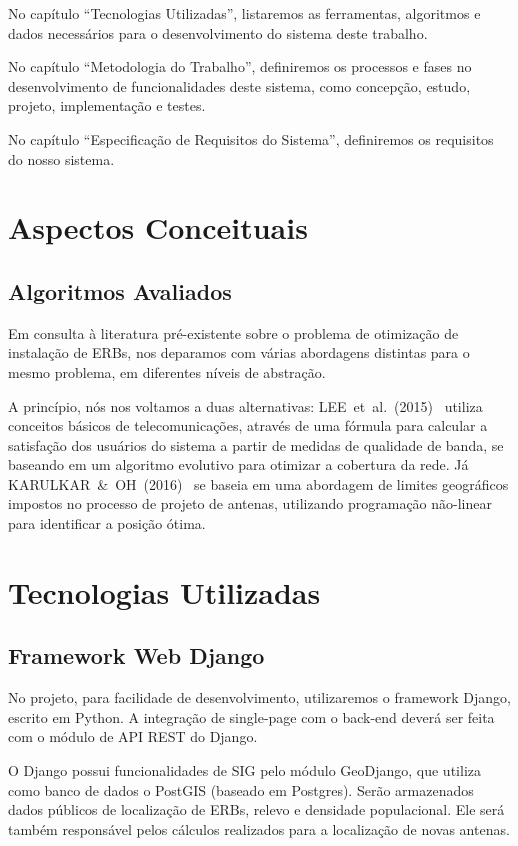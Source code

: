 \documentclass[]{politex}
\begin{document}
No capítulo ``Tecnologias Utilizadas'', listaremos as ferramentas, algoritmos
e dados necessários para o desenvolvimento do sistema deste trabalho.

No capítulo ``Metodologia do Trabalho'', definiremos os processos e fases
no desenvolvimento de funcionalidades deste sistema, como concepção, estudo,
projeto, implementação e testes.

No capítulo ``Especificação de Requisitos do Sistema'', definiremos os
requisitos do nosso sistema.

\chapter{Aspectos Conceituais}

\section{Algoritmos Avaliados}
Em consulta à literatura pré-existente sobre o problema de otimização de
instalação de ERBs, nos deparamos com várias abordagens distintas para o mesmo
problema, em diferentes níveis de abstração.

A princípio, nós nos voltamos a duas alternativas: LEE~et~al.~(2015)~
\cite{evolutivo} utiliza conceitos básicos de telecomunicações, através de uma
fórmula para calcular a satisfação dos usuários do sistema a partir de medidas
de qualidade de banda, se baseando em um algoritmo evolutivo para otimizar
a cobertura da rede. Já KARULKAR~\&~OH~(2016)~\cite{nao-linear} se baseia em
uma abordagem de limites geográficos impostos no processo de projeto de antenas,
utilizando programação não-linear para identificar a posição ótima.

\chapter{Tecnologias Utilizadas}

\section{Framework Web Django}
No projeto, para facilidade de desenvolvimento, utilizaremos o framework Django,
escrito em Python. A integração de single-page com o back-end deverá ser feita
com o módulo de API REST do Django.

O Django possui funcionalidades de SIG pelo módulo GeoDjango, que utiliza como
banco de dados o PostGIS (baseado em Postgres). Serão armazenados
dados públicos de localização de ERBs, relevo e densidade populacional. Ele
será também responsável pelos cálculos realizados para a localização de novas
antenas.
\end{document}
